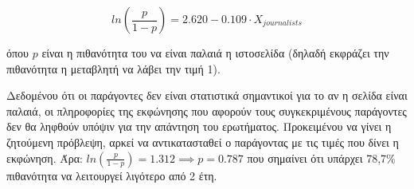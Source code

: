 \documentclass{assignment}
\begin{document}
\begin{Assignment}[Μέρος Ε]
\begin{equation}
ln(\frac{p}{1-p}) = 2.620 -0.109 \cdot X_{journalists}
\end{equation}

όπου $p$ είναι η πιθανότητα του να είναι παλαιά η ιστοσελίδα (δηλαδή εκφράζει την πιθανότητα η μεταβλητή να λάβει την τιμή 1).


Δεδομένου ότι οι παράγοντες  δεν είναι στατιστικά σημαντικοί για το αν η σελίδα είναι παλαιά, οι πληροφορίες της εκφώνησης που αφορούν τους συγκεκριμένους παράγοντες δεν θα ληφθούν υπόψιν για την απάντηση του ερωτήματος. Προκειμένου να γίνει η ζητούμενη πρόβλεψη, αρκεί να αντικατασταθεί ο παράγοντας  με τις τιμές που δίνει η εκφώνηση. Άρα:
$ln(\frac{p}{1-p}) = 1.312 \implies p = 0.787$ που σημαίνει ότι υπάρχει 78,7\% πιθανότητα να λειτουργεί λιγότερο από 2 έτη.

\end{Assignment}


 \label{Βιβλιογραφία}



\newpage
\end{document}
